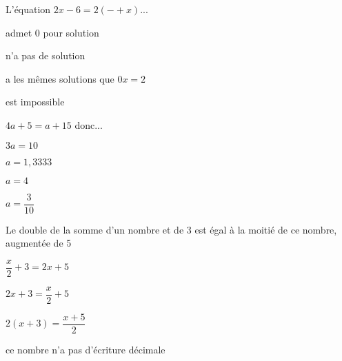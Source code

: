 \begin{QCM}
\begin{GroupeQCM}
\begin{exercice}
\begin{corrige}
\end{corrige}
\end{exercice}



\begin{exercice}
L'équation $2x - 6 = 2(-  + x)$...
\begin{ChoixQCM}{4}
\item admet 0 pour solution
\item n'a pas de solution
\item a les mêmes solutions que $0x = 2$
\item est impossible
\end{ChoixQCM}

\begin{corrige}
\end{corrige}
\end{exercice}



\begin{exercice}
$4a + 5 = a + 15$ donc...
\begin{ChoixQCM}{4}
\item $3a = 10$
\item $a = 1,3333$
\item $a = 4$
\item $a =\dfrac{3}{10}$
\end{ChoixQCM}

\begin{corrige}
\end{corrige}
\end{exercice}





\begin{exercice}
\og Le double de la somme d'un nombre et de 3 est égal à la moitié de ce nombre, augmentée de 5 \fg
\begin{ChoixQCM}{4}
\item $\dfrac{x}{2} + 3 = 2x + 5$
\item $2x + 3 = \dfrac{x}{2}+5$
\item $2(x + 3) =\dfrac{x+5}{2}$ 
\item ce nombre n'a pas d'écriture décimale
\end{ChoixQCM}

\begin{corrige}
\end{corrige}
\end{exercice}
\end{GroupeQCM}
\end{QCM}

